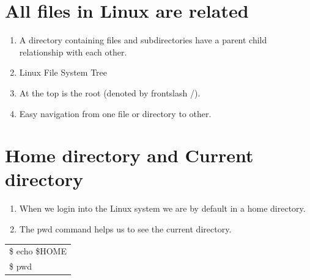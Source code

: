 \documentclass[12pt, a4paper]{report}
\begin{document}
\section{All files in Linux are related}
\begin{enumerate}
\item A directory containing files and subdirectories have a parent child relationship with each other.
\item Linux File System Tree
\item At the top is the root (denoted by frontslash /).
\item Easy navigation from one file or directory to other.
\end{enumerate}
\section{Home directory and Current directory}
\begin{enumerate}
\item When we login into the Linux system we are by default in a home directory.
\item The pwd command helps us to see the current directory.
\end{enumerate}
\begin{tabular}{|l|}\hline
\$ echo \$HOME \\
\$ pwd \\ \hline
\end{tabular}
\end{document}
